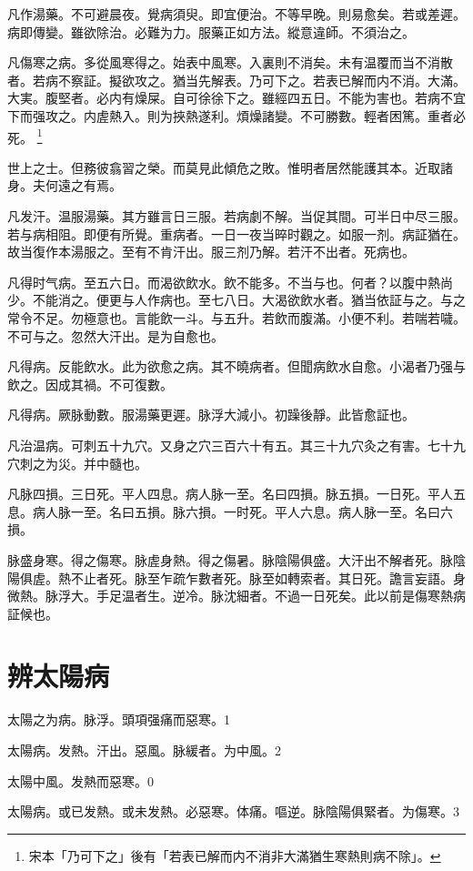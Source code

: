 \documentclass[b5paper,twoside,zihao=-4,UTF8]{ctexbook}
\begin{document}
凡作湯藥。不可避晨夜。覺病須臾。即宜便治。不等早晚。則易愈矣。若或差遲。病即傳變。雖欲除治。必難为力。服藥正如方法。縱意違師。不須治之。

凡傷寒之病。多從風寒得之。始表中風寒。入裏則不消矣。未有温覆而当不消散者。若病不察証。擬欲攻之。猶当先解表。乃可下之。若表已解而内不消。大滿。大実。腹堅者。必内有燥屎。自可徐徐下之。雖經四五日。不能为害也。若病不宜下而强攻之。内虗熱入。{則为}挾熱遂利。煩燥諸變。不可勝數。輕者困篤。重者必死。
	\footnote{宋本「乃可下之」後有「若表已解而内不消非大滿猶生寒熱則病不除」。}

世上之士。但務彼翕習之榮。而莫見此傾危之敗。惟明者居然能護其本。近取諸身。夫何遠之有焉。

凡发汗。温服湯藥。其方雖言日三服。若病劇不解。当促其間。可半日中尽三服。若与病相阻。即便有所覺。重病者。一日一夜当晬时觀之。如服一剂。病証猶在。故当復作本湯服之。至有不肯汗出。服三剂乃解。若汗不出者。死病也。

凡得时气病。至五六日。而渴欲飲水。飲不能多。不当与也。何者？以腹中熱尚少。不能消之。便更与人作病也。至七八日。大渴欲飲水者。猶当依証与之。与之常令不足。勿極意也。言能飲一斗。与五升。若飲而腹滿。小便不利。若喘若噦。不可与之。忽然大汗出。是为自愈也。

凡得病。反能飲水。此为欲愈之病。其不曉病者。但聞病飲水自愈。小渴者乃强与飲之。因成其禍。不可復數。

凡得病。厥脉動數。服湯藥更遲。脉浮大減小。初躁後靜。此皆愈証也。

凡治温病。可刺五十九穴。又身之穴三百六十有五。其三十九穴灸之有害。七十九穴刺之为災。并中髓也。

凡脉四損。三日死。平人四息。病人脉一至。名曰四損。脉五損。一日死。平人五息。病人脉一至。名曰五損。脉六損。一时死。平人六息。病人脉一至。名曰六損。

脉盛身寒。得之傷寒。脉虗身熱。得之傷暑。脉陰陽俱盛。大汗出不解者死。脉陰陽俱虗。熱不止者死。脉至乍疏乍數者死。脉至如轉索者。其日死。譫言妄語。身微熱。脉浮大。手足温者生。逆冷。脉沈細者。不過一日死矣。此以前是傷寒熱病証候也。

\chapter{辨太陽病}

太陽之为病。{脉浮。}頭項强痛而惡寒。1

太陽病。发熱。汗出。惡風。脉緩者。为中風。2

太陽中風。发熱而惡寒。0

太陽病。或已发熱。或未发熱。必惡寒。体痛。嘔逆。脉陰陽俱緊者。为傷寒。3
\end{document}
